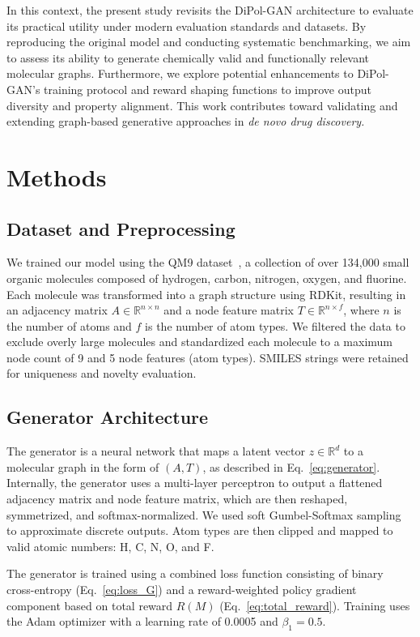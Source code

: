 \documentclass[conference]{IEEEtran}
\begin{document}
In this context, the present study revisits the DiPol-GAN architecture to evaluate its practical utility under modern evaluation standards and 
datasets. By reproducing the original model and conducting systematic benchmarking, we aim to assess its ability to generate chemically valid 
and functionally relevant molecular graphs. Furthermore, we explore potential enhancements to DiPol-GAN's training protocol and reward shaping 
functions to improve output diversity and property alignment. This work contributes toward validating and extending graph-based generative approaches in \it{de novo} drug discovery. 

\section{Methods}

\subsection{Dataset and Preprocessing}
We trained our model using the QM9 dataset~\cite{b4}, a collection of over 134,000 small organic molecules composed of hydrogen, 
carbon, nitrogen, oxygen, and fluorine. Each molecule was transformed into a graph structure using RDKit, resulting in an adjacency 
matrix $A \in \mathbb{R}^{n \times n}$ and a node feature matrix $T \in \mathbb{R}^{n \times f}$, where $n$ is the number of atoms 
and $f$ is the number of atom types. We filtered the data to exclude overly large molecules and standardized each molecule to a maximum 
node count of 9 and 5 node features (atom types). SMILES strings were retained for uniqueness and novelty evaluation.

\subsection{Generator Architecture}
The generator is a neural network that maps a latent vector $z \in \mathbb{R}^d$ to a molecular graph in the form of $(A, T)$, as 
described in Eq.~\eqref{eq:generator}. Internally, the generator uses a multi-layer perceptron to output a flattened adjacency matrix 
and node feature matrix, which are then reshaped, symmetrized, and softmax-normalized. We used soft Gumbel-Softmax sampling to approximate 
discrete outputs. Atom types are then clipped and mapped to valid atomic numbers: H, C, N, O, and F.

The generator is trained using a combined loss function consisting of binary cross-entropy (Eq.~\eqref{eq:loss_G}) and a reward-weighted 
policy gradient component based on total reward $R(M)$ (Eq.~\eqref{eq:total_reward}). Training uses the Adam optimizer with a learning rate 
of 0.0005 and $\beta_1 = 0.5$.
\end{document}
